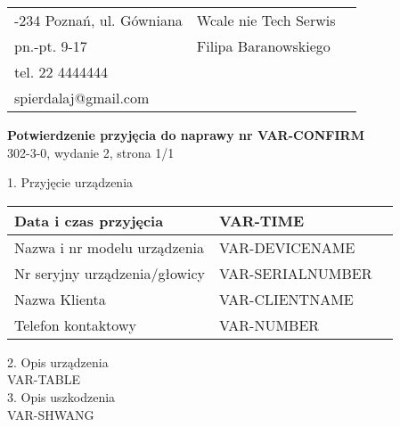\documentclass{article}
\begin{document}
\begin{tabularx}{\textwidth} { 
   >{\raggedright\arraybackslash}X 
   >{\centering\arraybackslash}X 
   >{\raggedleft\arraybackslash}X  }

61-234 Poznań, ul. Gówniana & \hspace{4mm} Wcale nie Tech Serwis \\
pn.-pt. 9-17 & \hspace{4mm}  Filipa Baranowskiego\\
tel. 22 4444444 &\\
spierdalaj@gmail.com &\\
\end{tabularx}


\begin{center}
\textbf{Potwierdzenie przyjęcia do naprawy nr VAR-CONFIRM} \\
302-3-0, wydanie 2, strona 1/1\\
\end{center}

1. Przyjęcie urządzenia\\
\begin{tabularx}{\textwidth} { 
  | >{\raggedright\arraybackslash}X 
  | >{\centering\arraybackslash}X 
  | >{\raggedleft\arraybackslash}X | }
\hline 
 Data i czas przyjęcia & VAR-TIME \\ 
\hline
 Nazwa i nr modelu urządzenia & VAR-DEVICENAME  \\  
\hline
 Nr seryjny urządzenia/głowicy & VAR-SERIALNUMBER   \\
\hline
Nazwa Klienta & VAR-CLIENTNAME \\
\hline
Telefon kontaktowy & VAR-NUMBER \\
\hline
\end{tabularx}\vspace{2mm}
2. Opis urządzenia \\
\vspace{2mm}
VAR-TABLE
\vspace{1mm} \\
3. Opis uszkodzenia \\
VAR-SHWANG
\end{document}
